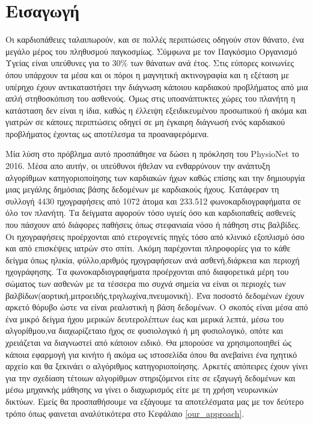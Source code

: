 \section{Εισαγωγή}
Οι καρδιοπάθειες ταλαιπωρούν, και σε πολλές περιπτώσεις οδηγούν στον θάνατο, ένα
μεγάλο μέρος του πληθυσμού παγκοσμίως. Σύμφωνα με τον Παγκόσμιο Οργανισμό Υγείας είναι
υπεύθυνες για το 30\% των θάνατων ανά έτος. Στις εύπορες κοινωνίες όπου υπάρχουν τα μέσα
και οι πόροι η μαγνητική ακτινογραφία και η εξέταση με υπέρηχο έχουν αντικαταστήσει την
διάγνωση κάποιου καρδιακού προβλήματος από μια απλή στηθοσκόπιση του ασθενούς. Όμως στις
υποανάπτυκτες χώρες του πλανήτη η κατάσταση δεν είναι η ίδια, καθώς η έλλειψη εξειδικευμένου
προσωπικού ή ακόμα και γιατρών σε κάποιες περιπτώσεις οδηγεί σε μη έγκαιρη διάγνωσή ενός καρδιακού
προβλήματος έχοντας ως αποτέλεσμα τα προαναφερόμενα.

Μία λύση στο πρόβλημα αυτό προσπάθησε να δώσει η πρόκληση του PhysioNet το
2016. Μέσα απο αυτήν, οι υπεύθυνοι ήθελαν να ενθαρρύνουν την ανάπτυξη αλγορίθμων
κατηγοριοποίησης των καρδιακών ήχων καθώς επίσης και την δημιουργία μιας μεγάλης
δημόσιας βάσης δεδομένων με καρδιακούς ήχους. Κατάφεραν τη συλλογή 4430 ηχογραφήσεις
από 1072 άτομα και 233.512 φωνοκαρδιογραφήματα σε όλο τον πλανήτη. Τα δείγματα αφορούν
τόσο υγιείς όσο και καρδιοπαθείς ασθενείς που πάσχουν από διάφορες παθήσεις όπως στεφανιαία
νόσο ή πάθηση στις βαλβίδες. Οι ηχογραφήσεις προέρχονται από ετερογενείς πηγές τόσο από κλινικό
εξοπλισμό όσο και από επισκέψεις ιατρών στο σπίτι. Ακόμη παρέχονται πληροφορίες για το κάθε δείγμα
όπως ηλικία, φύλλο,αριθμός ηχογραφήσεων ανά ασθενή,διάρκεια και περιοχή ηχογράφησης. Τα φωνοκαρδιογραφήματα
προέρχονται από διαφορετικά μέρη του σώματος των ασθενών με τα τέσσερα
πιο συχνά σημεία να είναι οι περιοχές των βαλβίδων(αορτική,μιτροειδής,τριγλωχίνα,πνευμονική). Ένα
ποσοστό δεδομένων έχουν αρκετό θόρυβο ώστε να είναι ρεαλιστική η βάση δεδομένων.
Ο σκοπός είναι μέσα από ένα μικρό δείγμα ήχου μερικών δευτερολέπτων έως και μερικά λεπτά,
μέσω του αλγορίθμου,να διαχωρίζεταιο ήχος σε φυσιολογικό ή μη φυσιολογικό, οπότε και χρειάζεται
να διαγνωστεί από κάποιον ειδικό. Θα μπορούσε να χρησιμοποιηθεί ώς κάποια εφαρμογή για κινήτο
ή ακόμα ως ιστοσελίδα όπου θα ανεβαίνει ένα ηχητικό αρχείο και θα ξεκινάει ο αλγόριθμος κατηγοριοποίησης.
Αρκετές απόπειρες έχουν γίνει για την σχεδίαση τέτοιων αλγορίθμων στηριζόμενοι είτε σε εξαγωγή δεδομένων
και μέσω μηχανκής μάθησης να γίνει ο διαχωρισμός είτε με τη χρήση νευρωνικών δικτύων. Εμείς
θα προσπαθήσουμε να εξάγουμε τα αποτελέσματα μας με τον δεύτερο τρόπο όπως φαινεται αναλύτικότερα
στο Κεφάλαιο \ref{our_approach}.
